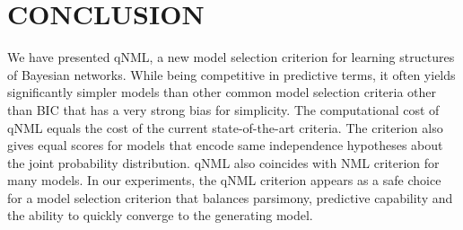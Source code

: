 \section{CONCLUSION}

We have presented qNML, a new model selection criterion for learning
structures of Bayesian networks.  While being competitive in
predictive terms, it often yields significantly simpler models than
other common model selection criteria other than BIC that has a very strong
bias for simplicity. The computational cost of qNML
equals the cost of the current state-of-the-art criteria. The
criterion also gives equal scores for models that encode same
independence hypotheses about the joint probability distribution.
qNML also coincides with NML criterion for many models.
In our experiments, the qNML criterion appears as a safe choice for a
model selection criterion that balances
parsimony, predictive capability and the ability to quickly converge to the
generating model.
